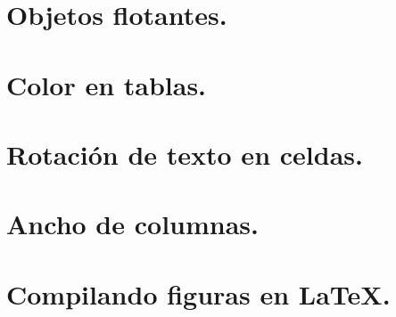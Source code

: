\documentclass[11pt]{beamer}
\theoremstyle{plain} %
\theoremstyle{definition}
\begin{document}
    \section[Objetos flotantes]{Objetos flotantes.}
    \section[Color en tablas]{Color en tablas.}
    \section[Rotación de texto en celdas]{Rotación de texto en celdas.}
    \section[Ancho de columnas]{Ancho de columnas.}
    \section[Compilando figuras en \LaTeX{}]{Compilando figuras en \LaTeX{}.}
	
\end{document}
